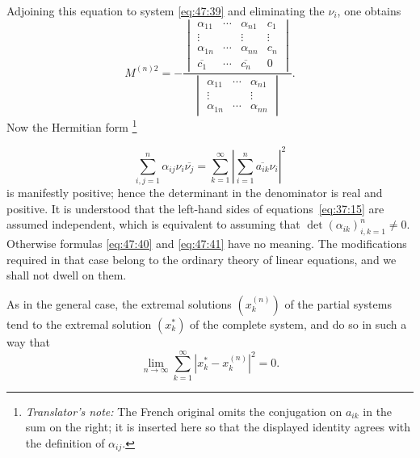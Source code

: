 \documentclass[
  paper=b5,
  fontsize=13pt,
  twoside=true,
  open=any,
  bookmarkpackage=false,
  chapterprefix=true,
  headings=normal
]{scrbook}
\theoremstyle{definition}
\newcounter{translatornote}
\newcommand{\translatornotelabel}{T\arabic{translatornote}}
\newcommand{\translatornote}[1]{%
  \stepcounter{translatornote}%
  \begingroup
    \edef\savedfootnotenumber{\number\value{footnote}}%
    \renewcommand{\thefootnote}{\translatornotelabel}%
    \footnote{\emph{Translator's note:} #1}%
    \setcounter{footnote}{\savedfootnotenumber}%
  \endgroup
}
\begin{document}
Adjoining this equation to system \eqref{eq:47:39} and eliminating the
$\nu_i$, one obtains
\begin{equation}
 M^{(n)2}=-
 \frac{
 \begin{vmatrix}
  \alpha_{11}&\cdots&\alpha_{n1}&c_1\\
  \vdots&&\vdots&\vdots\\
  \alpha_{1n}&\cdots&\alpha_{nn}&c_n\\
  \overline{c_1}&\cdots&\overline{c_n}&0
 \end{vmatrix}}
 {\begin{vmatrix}
  \alpha_{11}&\cdots&\alpha_{n1}\\
  \vdots&&\vdots\\
  \alpha_{1n}&\cdots&\alpha_{nn}
 \end{vmatrix}}.
 \tag{41}\label{eq:47:41}
\end{equation}
Now the Hermitian form\translatornote{The French original omits the conjugation
on \(a_{ik}\) in the sum on the right; it is inserted here so that the displayed
identity agrees with the definition of \(\alpha_{ij}\).}
\[
  \sum_{i,j=1}^{n}\alpha_{ij}\nu_i\overline{\nu_j}
  =\sum_{k=1}^{\infty}\left|\sum_{i=1}^{n}\overline{a_{ik}}\nu_i\right|^2
\]
is manifestly positive; hence the determinant in the denominator is real
and positive. It is understood that the left-hand sides of equations~\eqref{eq:37:15}
are assumed independent, which is equivalent to assuming that
$\det(\alpha_{ik})_{i,k=1}^{n}\neq0$. Otherwise formulas \eqref{eq:47:40} and
\eqref{eq:47:41} have no meaning. The modifications required in that case
belong to the ordinary theory of linear equations, and we shall not dwell
on them.

As in the general case, the extremal solutions $(x_k^{(n)})$ of the partial
systems tend to the extremal solution $(x_k^*)$ of the complete system, and
do so in such a way that
\[
  \lim_{n\to\infty}\sum_{k=1}^{\infty}|x_k^*-x_k^{(n)}|^2=0.
\]
\end{document}
